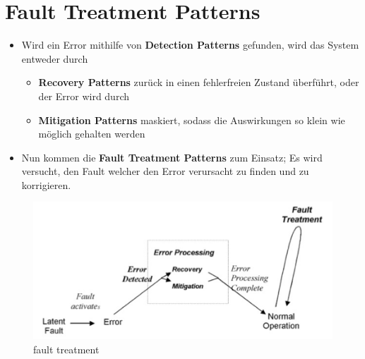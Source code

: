 \section{Fault Treatment Patterns}


\begin{itemize}
	\item Wird ein Error mithilfe von \textbf{Detection Patterns} gefunden, wird das System entweder durch
	\begin{itemize}
		\item \textbf{Recovery Patterns} zurück in einen fehlerfreien Zustand überführt, oder der Error wird durch
		\item \textbf{Mitigation Patterns} maskiert, sodass die Auswirkungen so klein wie möglich gehalten werden
	\end{itemize}
	\item Nun kommen die \textbf{Fault Treatment Patterns} zum Einsatz; Es wird versucht, den Fault welcher den Error verursacht zu finden und zu korrigieren.
\end{itemize}



\begin{figure}[H]
	\centering
	\includegraphics[width=\textwidth]{content/faulttolerance/images/fault_treatment.png}
	\caption{fault treatment}
\end{figure}




